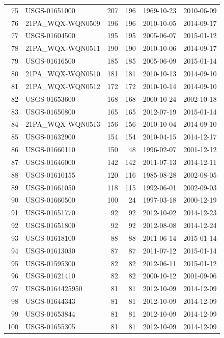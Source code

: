 \documentclass[a4paper,11pt]{article}\usepackage[]{graphicx}\usepackage[]{color}
\begin{document}
\begin{table}[ht]
\begin{tabular}{rlrrll}
  75 & USGS-01651000 & 207 & 196 & 1969-10-23 & 2010-06-09 \\ 
  76 & 21PA\_WQX-WQN0509 & 196 & 196 & 2010-10-05 & 2014-09-17 \\ 
  77 & USGS-01604500 & 195 & 195 & 2005-06-07 & 2015-01-12 \\ 
  78 & 21PA\_WQX-WQN0511 & 190 & 190 & 2010-10-06 & 2014-09-17 \\ 
  79 & USGS-01616500 & 185 & 185 & 2005-06-09 & 2015-01-14 \\ 
  80 & 21PA\_WQX-WQN0510 & 181 & 181 & 2010-10-13 & 2014-09-10 \\ 
  81 & 21PA\_WQX-WQN0512 & 172 & 172 & 2010-10-14 & 2014-09-10 \\ 
  82 & USGS-01653600 & 168 & 168 & 2000-10-24 & 2002-10-18 \\ 
  83 & USGS-01650800 & 165 & 165 & 2012-07-19 & 2015-01-14 \\ 
  84 & 21PA\_WQX-WQN0513 & 156 & 156 & 2010-10-04 & 2014-09-10 \\ 
  85 & USGS-01632900 & 154 & 154 & 2010-04-15 & 2014-12-17 \\ 
  86 & USGS-01660110 & 150 &  48 & 1996-02-07 & 2001-12-12 \\ 
  87 & USGS-01646000 & 142 & 142 & 2011-07-13 & 2014-12-11 \\ 
  88 & USGS-01610155 & 120 & 116 & 1985-08-28 & 2002-08-05 \\ 
  89 & USGS-01661050 & 118 & 115 & 1992-06-01 & 2002-09-03 \\ 
  90 & USGS-01660500 & 100 &  24 & 1997-03-18 & 2000-12-19 \\ 
  91 & USGS-01651770 &  92 &  92 & 2012-10-02 & 2014-12-23 \\ 
  92 & USGS-01651800 &  92 &  92 & 2012-08-08 & 2014-12-24 \\ 
  93 & USGS-01618100 &  88 &  88 & 2011-06-14 & 2015-01-14 \\ 
  94 & USGS-01613030 &  87 &  87 & 2011-07-12 & 2015-01-14 \\ 
  95 & USGS-01595300 &  82 &  82 & 2012-06-11 & 2015-01-12 \\ 
  96 & USGS-01621410 &  82 &  82 & 2000-10-12 & 2001-09-06 \\ 
  97 & USGS-0164425950 &  81 &  81 & 2012-10-09 & 2014-12-09 \\ 
  98 & USGS-01644343 &  81 &  81 & 2012-10-09 & 2014-12-09 \\ 
  99 & USGS-01653844 &  81 &  81 & 2012-10-09 & 2014-12-09 \\ 
  100 & USGS-01655305 &  81 &  81 & 2012-10-09 & 2014-12-09 \\ 

\end{tabular}
\end{table}
\end{document}

